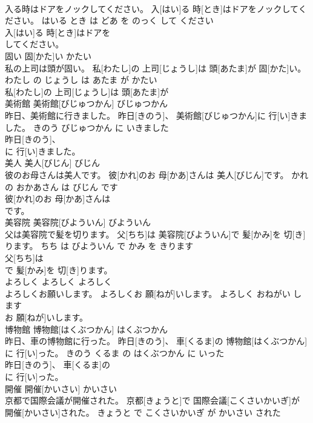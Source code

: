 \documentclass[8pt]{extreport}
\begin{document}
\begin{CJK}{UTF8}{min}
\\	入る時はドアをノックしてください。	入[はい]る 時[とき]はドアをノックしてください。	はいる とき は どあ を のっく して ください	
\\	入[はい]る 時[とき]はドアを
\\	してください。			
\\	固い	固[かた]い	かたい	
\\	私の上司は頭が固い。	私[わたし]の 上司[じょうし]は 頭[あたま]が 固[かた]い。	わたし の じょうし は あたま が かたい	
\\	私[わたし]の 上司[じょうし]は 頭[あたま]が
\\	美術館	美術館[びじゅつかん]	びじゅつかん	
\\	昨日、美術館に行きました。	昨日[きのう]、 美術館[びじゅつかん]に 行[い]きました。	きのう びじゅつかん に いきました	
\\	昨日[きのう]、
\\	に 行[い]きました。			
\\	美人	美人[びじん]	びじん	
\\	彼のお母さんは美人です。	彼[かれ]のお 母[かあ]さんは 美人[びじん]です。	かれ の おかあさん は びじん です	
\\	彼[かれ]のお 母[かあ]さんは
\\	です。			
\\	美容院	美容院[びよういん]	びよういん	
\\	父は美容院で髪を切ります。	父[ちち]は 美容院[びよういん]で 髪[かみ]を 切[き]ります。	ちち は びよういん で かみ を きります	
\\	父[ちち]は
\\	で 髪[かみ]を 切[き]ります。			
\\	よろしく	よろしく	よろしく	
\\	よろしくお願いします。	よろしくお 願[ねが]いします。	よろしく おねがい します	
\\	お 願[ねが]いします。			
\\	博物館	博物館[はくぶつかん]	はくぶつかん	
\\	昨日、車の博物館に行った。	昨日[きのう]、 車[くるま]の 博物館[はくぶつかん]に 行[い]った。	きのう くるま の はくぶつかん に いった	
\\	昨日[きのう]、 車[くるま]の
\\	に 行[い]った。			
\\	開催	開催[かいさい]	かいさい	
\\	京都で国際会議が開催された。	京都[きょうと]で 国際会議[こくさいかいぎ]が 開催[かいさい]された。	きょうと で こくさいかいぎ が かいさい された	

\end{CJK}
\end{document}
